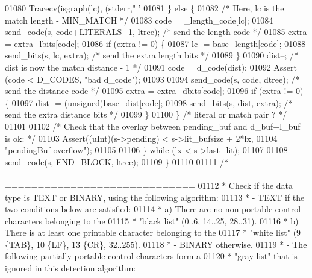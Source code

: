 \begin{DoxyCode}
{{{{{{{{{{{{{{{{{{{{{{{01080             Tracecv(isgraph(lc), (stderr,\textcolor{stringliteral}{" '%
01081         \} \textcolor{keywordflow}{else} \{
01082             \textcolor{comment}{/* Here, lc is the match length - MIN\_MATCH */}
01083             code = \_length\_code[lc];
01084             send\_code(s, code+LITERALS+1, ltree); \textcolor{comment}{/* send the length code */}
01085             extra = extra\_lbits[code];
01086             \textcolor{keywordflow}{if} (extra != 0) \{
01087                 lc -= base\_length[code];
01088                 send\_bits(s, lc, extra);       \textcolor{comment}{/* send the extra length bits */}
01089             \}
01090             dist--; \textcolor{comment}{/* dist is now the match distance - 1 */}
01091             code = d\_code(dist);
01092             Assert (code < D\_CODES, \textcolor{stringliteral}{"bad d\_code"});
01093 
01094             send\_code(s, code, dtree);       \textcolor{comment}{/* send the distance code */}
01095             extra = extra\_dbits[code];
01096             \textcolor{keywordflow}{if} (extra != 0) \{
01097                 dist -= (unsigned)base\_dist[code];
01098                 send\_bits(s, dist, extra);   \textcolor{comment}{/* send the extra distance bits */}
01099             \}
01100         \} \textcolor{comment}{/* literal or match pair ? */}
01101 
01102         \textcolor{comment}{/* Check that the overlay between pending\_buf and d\_buf+l\_buf is ok: */}
01103         Assert((uInt)(s->pending) < s->lit\_bufsize + 2*lx,
01104                \textcolor{stringliteral}{"pendingBuf overflow"});
01105 
01106     \} \textcolor{keywordflow}{while} (lx < s->last\_lit);
01107 
01108     send\_code(s, END\_BLOCK, ltree);
01109 \}
01110 
01111 \textcolor{comment}{/* ===========================================================================}
01112 \textcolor{comment}{ * Check if the data type is TEXT or BINARY, using the following algorithm:}
01113 \textcolor{comment}{ * - TEXT if the two conditions below are satisfied:}
01114 \textcolor{comment}{ *    a) There are no non-portable control characters belonging to the}
01115 \textcolor{comment}{ *       "black list" (0..6, 14..25, 28..31).}
01116 \textcolor{comment}{ *    b) There is at least one printable character belonging to the}
01117 \textcolor{comment}{ *       "white list" (9 \{TAB\}, 10 \{LF\}, 13 \{CR\}, 32..255).}
01118 \textcolor{comment}{ * - BINARY otherwise.}
01119 \textcolor{comment}{ * - The following partially-portable control characters form a}
01120 \textcolor{comment}{ *   "gray list" that is ignored in this detection algorithm:}
}}}}}}}}}}}}}}}}}}}}}}}}
\end{DoxyCode}
